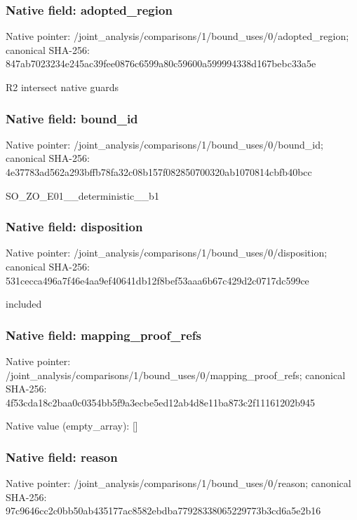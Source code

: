 \documentclass[10pt,a4paper]{article}
\begin{document}
\subsubsection{Native field: adopted\_\allowbreak{}region}
Native pointer: /joint\_\allowbreak{}analysis/comparisons/1/bound\_\allowbreak{}uses/0/adopted\_\allowbreak{}region; canonical SHA-256: 847ab7023234e245ac39fee0876c6599a80c59600a599994338d167bebc33a5e

\begingroup\raggedright\sloppy R2 intersect native guards\par\endgroup

\subsubsection{Native field: bound\_\allowbreak{}id}
Native pointer: /joint\_\allowbreak{}analysis/comparisons/1/bound\_\allowbreak{}uses/0/bound\_\allowbreak{}id; canonical SHA-256: 4e37783ad562a293bffb78fa32c08b157f082850700320ab1070814cbfb40bcc

\begingroup\raggedright\sloppy SO\_\allowbreak{}ZO\_\allowbreak{}E01\_\allowbreak{}\_\allowbreak{}deterministic\_\allowbreak{}\_\allowbreak{}b1\par\endgroup

\subsubsection{Native field: disposition}
Native pointer: /joint\_\allowbreak{}analysis/comparisons/1/bound\_\allowbreak{}uses/0/disposition; canonical SHA-256: 531cecca496a7f46e4aa9ef40641db12f8bef53aaa6b67c429d2c0717dc599ce

\begingroup\raggedright\sloppy included\par\endgroup

\subsubsection{Native field: mapping\_\allowbreak{}proof\_\allowbreak{}refs}
Native pointer: /joint\_\allowbreak{}analysis/comparisons/1/bound\_\allowbreak{}uses/0/mapping\_\allowbreak{}proof\_\allowbreak{}refs; canonical SHA-256: 4f53cda18c2baa0c0354bb5f9a3ecbe5ed12ab4d8e11ba873c2f11161202b945

Native value (empty\_\allowbreak{}array): []

\subsubsection{Native field: reason}
Native pointer: /joint\_\allowbreak{}analysis/comparisons/1/bound\_\allowbreak{}uses/0/reason; canonical SHA-256: 97c9646cc2c0bb50ab435177ac8582ebdba77928338065229773b3cd6a5e2b16
\end{document}
